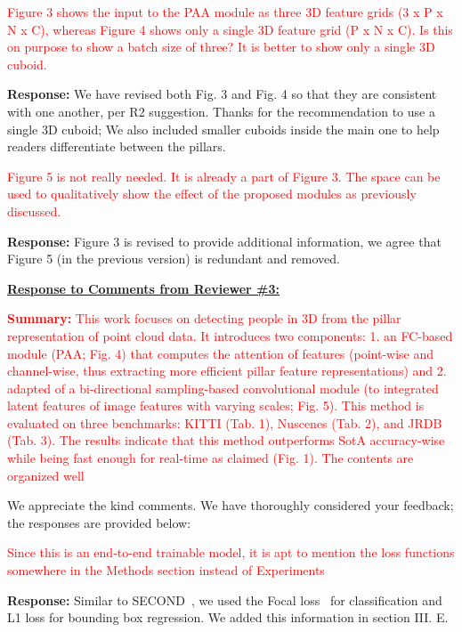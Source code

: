 \documentclass[11pt]{article}
\begin{document}
\textcolor{red}{Figure 3 shows the input to the PAA module as three 3D feature grids
(3 x P x N x C), whereas Figure 4 shows only a single 3D feature grid
(P x N x C). Is this on purpose to show a batch size of three? It is
better to show only a single 3D cuboid.} 

\textbf{Response:} We have revised both Fig. 3 and Fig. 4 so that they are consistent with one another, per R2 suggestion. Thanks for the recommendation to use a single 3D cuboid; We also included smaller cuboids inside the main one to help readers differentiate between the pillars. 

\textcolor{red}{Figure 5 is not really needed. It is already a part of Figure 3. The
space can be used to qualitatively show the effect of the proposed
modules as previously discussed.} 

\textbf{Response:} Figure 3 is revised to provide additional information, we agree that Figure 5 (in the previous version) is redundant and removed. 



\vspace{20pt}
\underline{\textbf{Response to Comments from Reviewer \#3:}}

\textcolor{red}{\textbf{Summary:} This work focuses on detecting people in 3D from the pillar representation of
point cloud data. It introduces two components:
1. an FC-based module (PAA; Fig. 4) that computes the attention of features
(point-wise and channel-wise, thus extracting more efficient pillar feature
representations) and
2. adapted of a bi-directional sampling-based convolutional module (to
integrated latent features of image features with varying scales; Fig. 5).
This method is evaluated on three benchmarks: KITTI (Tab. 1), Nuscenes (Tab.
2), and JRDB (Tab. 3). The results indicate that this method outperforms SotA
accuracy-wise while being fast enough for real-time as claimed (Fig. 1).
The contents are organized well}

We appreciate the kind comments. We have thoroughly considered your feedback; the responses are provided below:

\textcolor{red}{Since this is an end-to-end trainable model, it is apt to mention the loss
functions somewhere in the Methods section instead of Experiments} 

\textbf{Response:} Similar to SECOND~\cite{yan2018second}, we used the Focal loss~\cite{lin2017focal} for classification and L1 loss for bounding box regression. We added this information in section III. E. 
\end{document}
